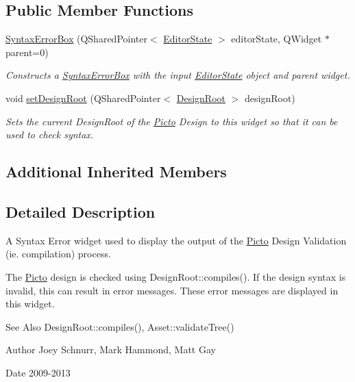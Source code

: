 \subsection*{Public Member Functions}
\begin{DoxyCompactItemize}
\item 
\hyperlink{class_syntax_error_box_a1d45d93eec04e6689cb68bed6d003e6f}{Syntax\-Error\-Box} (Q\-Shared\-Pointer$<$ \hyperlink{class_editor_state}{Editor\-State} $>$ editor\-State, Q\-Widget $\ast$parent=0)
\begin{DoxyCompactList}\small\item\em Constructs a \hyperlink{class_syntax_error_box}{Syntax\-Error\-Box} with the input \hyperlink{class_editor_state}{Editor\-State} object and parent widget. \end{DoxyCompactList}\item 
\hypertarget{class_syntax_error_box_ae28581de605e6916f103c7ded7cba7cc}{void \hyperlink{class_syntax_error_box_ae28581de605e6916f103c7ded7cba7cc}{set\-Design\-Root} (Q\-Shared\-Pointer$<$ \hyperlink{class_picto_1_1_design_root}{Design\-Root} $>$ design\-Root)}\label{class_syntax_error_box_ae28581de605e6916f103c7ded7cba7cc}

\begin{DoxyCompactList}\small\item\em Sets the current Design\-Root of the \hyperlink{namespace_picto}{Picto} Design to this widget so that it can be used to check syntax. \end{DoxyCompactList}\end{DoxyCompactItemize}
\subsection*{Additional Inherited Members}


\subsection{Detailed Description}
A Syntax Error widget used to display the output of the \hyperlink{namespace_picto}{Picto} Design Validation (ie. compilation) process. 

The \hyperlink{namespace_picto}{Picto} design is checked using Design\-Root\-::compiles(). If the design syntax is invalid, this can result in error messages. These error messages are displayed in this widget. \begin{DoxySeeAlso}{See Also}
Design\-Root\-::compiles(), Asset\-::validate\-Tree() 
\end{DoxySeeAlso}
\begin{DoxyAuthor}{Author}
Joey Schnurr, Mark Hammond, Matt Gay 
\end{DoxyAuthor}
\begin{DoxyDate}{Date}
2009-\/2013 
\end{DoxyDate}


